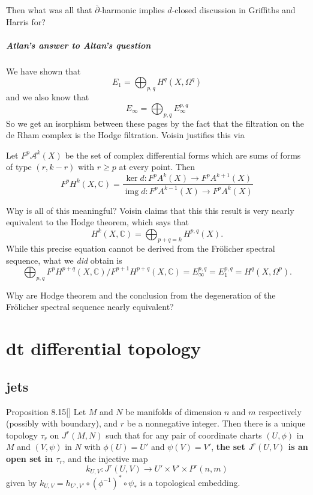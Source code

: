 \begin{question}[Dani]
	Then what was all that $\bar\partial$-harmonic implies $d$-closed discussion in Griffiths and Harris for?
\end{question}

\paragraph{Atlan's answer to Altan's question} We have shown that
\[E_1=\bigoplus_{p,q} H^{q}(X,\Omega^q)\]
and we also know that
\[E_\infty=\bigoplus_{p,q} E_\infty^{p,q} \]
So we get an isorphism between these pages by the fact that the filtration on the de Rham complex is the Hodge filtration. Voisin justifies this via 
\begin{prop}[Voisin, 7.5]
Let $F^p\mathcal{A}^k(X)$ be the set of complex differential forms which are sums of forms of type $(r,k-r)$ with $r\geq p$ at every point. Then
\[F^pH^{k}(X,\mathbb{C})=\dfrac{\operatorname{ker} d:F^pA^k(X)\to F^pA^{k+1}(X) }{\operatorname{img} d:F^pA^{k-1}(X)\to F^pA^k(X)}\]
\end{prop}

\begin{remark}
	Why is all of this meaningful? Voisin claims that this this result is very nearly equivalent to the Hodge theorem, which says that
\begin{equation*}\label{eq:hodge-decom}
	 H^{k}(X,\mathbb{C})=\bigoplus_{p+q=k} H^{p,q}(X).
\end{equation*}
While this precise equation cannot be derived from the Fr\"olicher spectral sequence, what we \textit{did} obtain is
\[\bigoplus_{p,q}F^pH^{p+q}(X,\mathbb{C})/F^{p+1}H^{p+q}(X,\mathbb{C})=E^{p,q}_{\infty}=E^{p,q}_{1}=H^q(X,\Omega^p).\]

\begin{question}
	Why are Hodge theorem and the conclusion from the degeneration of the Fr\"olicher spectral sequence nearly equivalent?
\end{question}
\end{remark}



\chapter{dt differential topology}

\section{jets}
\begin{thing6}{Proposition 8.15}[\cite{muk}]\label{prop:8.15}\leavevmode
	Let \(M\) and \(N\) be manifolds of dimension \(n\) and \(m\) respectively (possibly with boundary), and \(r\) be a nonnegative integer. Then there is a unique topology \(\tau_r\) on \(J^r(M,N)\) such that for any pair of coordinate charts \((U,\phi)\) in \(M\) and \((V,\psi)\) in \(N\) with \(\phi(U)=U'\) and \(\psi(V)=V'\), \textbf{the set \(J^r(U,V)\) is an open set in \(\tau_r\)}, and the injective map
	\[k_{U,V}:J^r(U,V) \longrightarrow U'\times V' \times P^r(n,m)\]
given by \(k_{U,V}=h_{U',V'}\circ(\phi^{-1})^* \circ \psi_*\) is a topological embedding.
\end{thing6}

